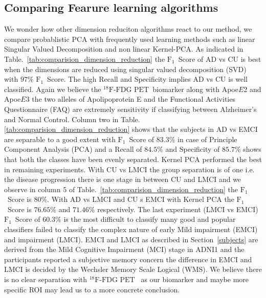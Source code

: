 \documentclass[authoryear,preprint,revi	ew,12pt]{elsarticle}
\newcommand{\acc}[1]     {$ #1 \% $}
\newcommand{\Alzheimers} {{Alzheimer\textquoteright s} }
\newcommand{\F}   {$ \textrm{F}_1 $}
\newcommand{\FDGPET}   {$ ^{18}\textrm{F-FDG PET} $}
\newcommand{\apoe}[1]   {Apoe$ E $#1}
\begin{document}
\subsection{Comparing Fearure learning algorithms}
\label{subsection:dim_red}
We wonder how other dimension reduciton algorithms react to our method, we compare probablistic PCA with frequently used learning methods such as linear Singular Valued Decomposition and non linear Kernel-PCA.
As indicated in Table.~\ref{tab:comparision_dimension_reduction} the \F~Score of AD vs CU is best when the dimensions are reduced using singular valued decomposition (SVD) with \acc{97} \F~Score. The high Recall and Specificity implies AD vs CU is well classified. Again we believe the \FDGPET~biomarker along with \apoe{2} and \apoe{3} the two alleles of Apolipoprotein E and the Functional Activities Questionnaire (FAQ) are extremely sensitivity if classifying between \Alzheimers and Normal Control. 
Column two in Table.\ref{tab:comparision_dimension_reduction} shows that the subjects in AD vs EMCI are separable to a good extent with \F~Score of \acc{83.3} in case of Principle Component Analysis (PCA) and a Recall of \acc{84.5} and Specificity of \acc{85.7} shows that both the classes have been evenly separated. 
Kernel PCA \citep{mika1998kernel} performed the best in remaining experiments. With CU vs LMCI the group separation is of one i.e. the disease progression there is one stage in between CU and LMCI and we observe in column 5 of Table.~\ref{tab:comparision_dimension_reduction} the \F~Score is \acc{80}. With AD vs LMCI and CU s EMCI with Kernel PCA the \F~Score is \acc{76.65} and \acc{71.46} respectively. The last experiment (LMCI vs EMCI) \F~Score of \acc{60.3} is the most difficult to classify many good and popular classifiers failed to classify the complex nature of early Mild impairment (EMCI) and impairment (LMCI). EMCI and LMCI as described in Section~\ref{subjects} are derived from the Mild Cognitive Impairment (MCI) stage in ADNI1 and the participants reported a subjective memory concern the difference in EMCI and LMCI is decided by the Wechsler Memory Scale Logical (WMS). We believe there is no clear separation with \FDGPET~ as our biomarker and maybe more specific ROI may lead us to a more concrete conclusion. 
\end{document}
